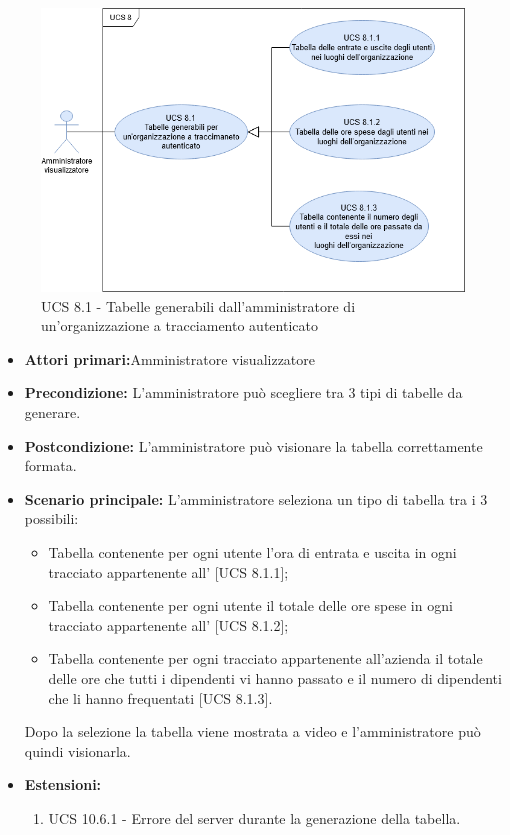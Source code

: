 \begin{figure}[h!]
	\centering
    \includegraphics[scale=0.53]{Sezioni/UseCase/Immagini/UCS8.1.png}
    \caption{UCS 8.1 - Tabelle generabili dall'amministratore di un'organizzazione a tracciamento autenticato}
\end{figure}

\begin{itemize}
\item \textbf{Attori primari:}Amministratore visualizzatore
\item \textbf{Precondizione:} L'amministratore può scegliere tra 3 tipi di tabelle da generare.
\item \textbf{Postcondizione:} L'amministratore può visionare la tabella correttamente formata.
\item \textbf{Scenario principale:} L'amministratore seleziona un tipo di tabella tra i 3 possibili:
	\begin{itemize}%
	\item Tabella contenente per ogni utente l'ora di entrata e uscita in ogni  tracciato appartenente all' [UCS 8.1.1];
	\item Tabella contenente per ogni utente il totale delle ore spese in ogni  tracciato appartenente all' [UCS 8.1.2];
	\item Tabella contenente per ogni  tracciato appartenente all'azienda il totale delle ore che tutti i dipendenti vi hanno passato e il numero di dipendenti che li hanno frequentati [UCS 8.1.3].
\end{itemize}
Dopo la selezione la tabella viene mostrata a video e l'amministratore può quindi visionarla.
\item \textbf{Estensioni:}
	\begin{enumerate}
		\item UCS 10.6.1 - Errore del server durante la generazione della tabella.
	\end{enumerate}
\end{itemize}

